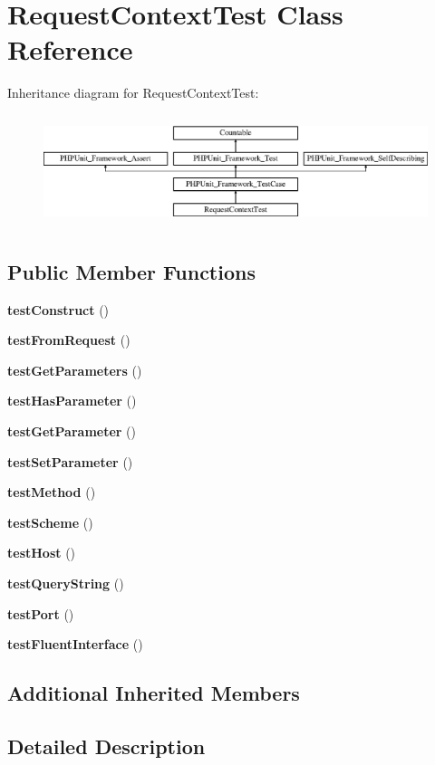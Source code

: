 \section{Request\+Context\+Test Class Reference}
\label{class_symfony_1_1_component_1_1_routing_1_1_tests_1_1_request_context_test}
Inheritance diagram for Request\+Context\+Test\+:\begin{figure}[H]
\begin{center}
\leavevmode
\includegraphics[height=3.303835cm]{class_symfony_1_1_component_1_1_routing_1_1_tests_1_1_request_context_test}
\end{center}
\end{figure}
\subsection*{Public Member Functions}
\begin{DoxyCompactItemize}
\item 
{\bf test\+Construct} ()
\item 
{\bf test\+From\+Request} ()
\item 
{\bf test\+Get\+Parameters} ()
\item 
{\bf test\+Has\+Parameter} ()
\item 
{\bf test\+Get\+Parameter} ()
\item 
{\bf test\+Set\+Parameter} ()
\item 
{\bf test\+Method} ()
\item 
{\bf test\+Scheme} ()
\item 
{\bf test\+Host} ()
\item 
{\bf test\+Query\+String} ()
\item 
{\bf test\+Port} ()
\item 
{\bf test\+Fluent\+Interface} ()
\end{DoxyCompactItemize}
\subsection*{Additional Inherited Members}


\subsection{Detailed Description}


